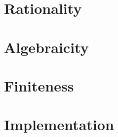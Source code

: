 \documentclass[sigconf]{acmart}
\theoremstyle{plain}
\theoremstyle{definition}
\theoremstyle{remark}
\begin{document}
\section{Rationality}

\section{Algebraicity}

\section{Finiteness}

\section{Implementation}
\end{document}
